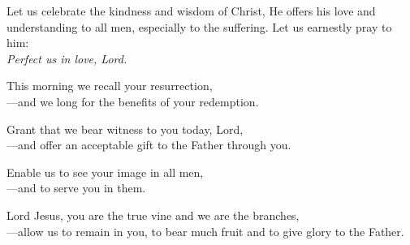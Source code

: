\intercessions

\begin{raggedright}
Let us celebrate the kindness and wisdom of Christ, He offers his love and understanding to all men, especially to the suffering. Let us earnestly pray to him:\\
\emph{Perfect us in love, Lord.}

\medskip
This morning we recall your resurrection,\\
{\color{red}---}and we long for the benefits of your redemption.

\medskip
Grant that we bear witness to you today, Lord,\\
{\color{red}---}and offer an acceptable gift to the Father through you.

\medskip
Enable us to see your image in all men,\\
{\color{red}---}and to serve you in them.

\medskip
Lord Jesus, you are the true vine and we are the branches,\\
{\color{red}---}allow us to remain in you, to bear much fruit and to give glory to the Father.
\end{raggedright}